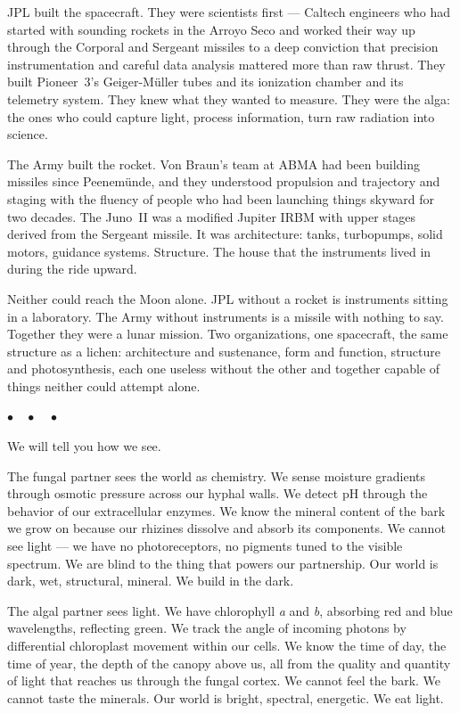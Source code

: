 \documentclass[12pt, letterpaper]{article}
\begin{document}
JPL built the spacecraft. They were scientists first --- Caltech engineers who had started with sounding rockets in the Arroyo Seco and worked their way up through the Corporal and Sergeant missiles to a deep conviction that precision instrumentation and careful data analysis mattered more than raw thrust. They built Pioneer~3's Geiger-M\"uller tubes and its ionization chamber and its telemetry system. They knew what they wanted to measure. They were the alga: the ones who could capture light, process information, turn raw radiation into science.

The Army built the rocket. Von Braun's team at ABMA had been building missiles since Peenem\"unde, and they understood propulsion and trajectory and staging with the fluency of people who had been launching things skyward for two decades. The Juno~II was a modified Jupiter IRBM with upper stages derived from the Sergeant missile. It was architecture: tanks, turbopumps, solid motors, guidance systems. Structure. The house that the instruments lived in during the ride upward.

Neither could reach the Moon alone. JPL without a rocket is instruments sitting in a laboratory. The Army without instruments is a missile with nothing to say. Together they were a lunar mission. Two organizations, one spacecraft, the same structure as a lichen: architecture and sustenance, form and function, structure and photosynthesis, each one useless without the other and together capable of things neither could attempt alone.

\begin{center}
$\bullet\quad\bullet\quad\bullet$
\end{center}

We will tell you how we see.

The fungal partner sees the world as chemistry. We sense moisture gradients through osmotic pressure across our hyphal walls. We detect pH through the behavior of our extracellular enzymes. We know the mineral content of the bark we grow on because our rhizines dissolve and absorb its components. We cannot see light --- we have no photoreceptors, no pigments tuned to the visible spectrum. We are blind to the thing that powers our partnership. Our world is dark, wet, structural, mineral. We build in the dark.

The algal partner sees light. We have chlorophyll \textit{a} and \textit{b}, absorbing red and blue wavelengths, reflecting green. We track the angle of incoming photons by differential chloroplast movement within our cells. We know the time of day, the time of year, the depth of the canopy above us, all from the quality and quantity of light that reaches us through the fungal cortex. We cannot feel the bark. We cannot taste the minerals. Our world is bright, spectral, energetic. We eat light.
\end{document}
